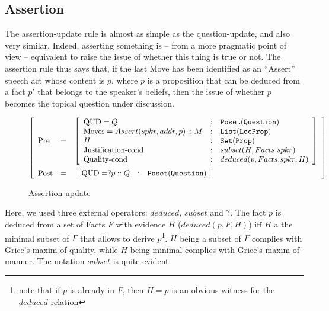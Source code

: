 \documentclass[11pt]{article}
\newenvironment{recenv}
{\left[\begin{array}{lll}}
{\end{array}\right]}
\begin{document}
			\subsection{Assertion}
				The assertion-update rule is almost as simple as the question-update, and also very similar. Indeed, asserting something is -- from a more pragmatic point of view -- equivalent to raise the issue of whether this thing is true or not. The assertion rule thus says that, if the last Move has been identified as an ``Assert'' speech act whose content is $p$, where $p$ is a proposition that can be deduced from a fact $p'$ that belongs to the speaker's beliefs, then the issue of whether $p$ becomes the topical question under discussion.\\
				\begin{figure*}[h]
					\begin{equation*}
						\begin{recenv}
							\mbox{Pre}  &=& \begin{recenv}
								\mbox{QUD} = Q &:& \texttt{Poset}(\texttt{Question})\\
								\mbox{Moves} = Assert(spkr, addr, p) :: M &:& \texttt{List}(\texttt{LocProp})\\
								H &:& \texttt{Set}(\texttt{Prop}) \\
								\mbox{Justification-cond} &:& subset(H, Facts.spkr) \\
								\mbox{Quality-cond} &:& deduced(p, Facts.spkr, H) \\
							\end{recenv} \vspace{2mm} \\
							\mbox{Post} &=& \begin{recenv}
								\mbox{QUD} = ?p :: Q &:& \texttt{Poset}(\texttt{Question})
							\end{recenv}
						\end{recenv}
					\end{equation*}
					\caption{Assertion update}
				\end{figure*}
				
				Here, we used three external operators: $deduced$, $subset$ and $?$. The fact $p$ is deduced from a set of Facts $F$ with evidence $H$ ($deduced(p, F, H)$) iff $H$ a the minimal subset of $F$ that allows to derive $p$\footnote{note that if $p$ is already in $F$, then $H=p$ is an obvious witness for the $deduced$ relation}. $H$ being a subset of $F$ complies with Grice's maxim of quality, while $H$ being minimal complies with Grice's maxim of manner. The notation $subset$ is quite evident. 
\end{document}
